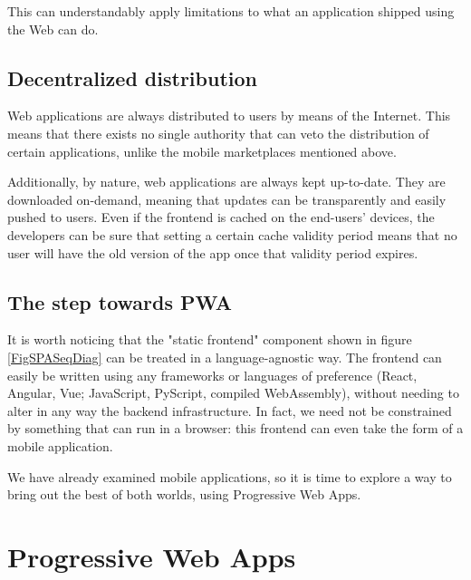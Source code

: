 This can understandably apply limitations to what an application shipped using the Web can do.

\subsection{Decentralized distribution}
Web applications are always distributed to users by means of the Internet. This means that there exists no single authority that can veto the distribution of certain applications, unlike the mobile marketplaces mentioned above.

Additionally, by nature, web applications are always kept up-to-date. They are downloaded on-demand, meaning that updates can be transparently and easily pushed to users. Even if the frontend is cached on the end-users' devices, the developers can be sure that setting a certain cache validity period means that no user will have the old version of the app once that validity period expires.

\subsection{The step towards PWA}

It is worth noticing that the "static frontend" component shown in figure \ref{FigSPASeqDiag} can be treated in a language-agnostic way. The frontend can easily be written using any frameworks or languages of preference (React, Angular, Vue; JavaScript, PyScript, compiled WebAssembly), without needing to alter in any way the backend infrastructure. In fact, we need not be constrained by something that can run in a browser: this frontend can even take the form of a mobile application.

We have already examined mobile applications, so it is time to explore a way to bring out the best of both worlds, using Progressive Web Apps.

\section{Progressive Web Apps}
